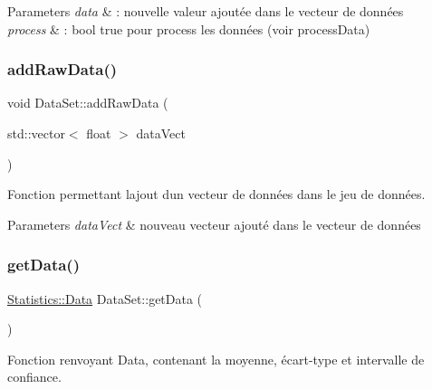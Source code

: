 \begin{DoxyParams}{Parameters}
{\em data} & \+: nouvelle valeur ajoutée dans le vecteur de données \\
\hline
{\em process} & \+: bool true pour process les données (voir process\+Data) \\
\hline
\end{DoxyParams}
\mbox{\label{classDataSet_a71cfe353100966c9bdfb1f6880075691}} 
\subsubsection{\texorpdfstring{add\+Raw\+Data()}{addRawData()}\hspace{0.1cm}{\footnotesize\ttfamily [2/2]}}
{\footnotesize\ttfamily void Data\+Set\+::add\+Raw\+Data (\begin{DoxyParamCaption}\item[{std\+::vector$<$ float $>$}]{data\+Vect }\end{DoxyParamCaption})}



Fonction permettant l\textquotesingle{}ajout d\textquotesingle{}un vecteur de données dans le jeu de données. 


\begin{DoxyParams}{Parameters}
{\em data\+Vect} & nouveau vecteur ajouté dans le vecteur de données \\
\hline
\end{DoxyParams}
\mbox{\label{classDataSet_af646e5b745734c1b18f2e90117e1d3c1}} 
\subsubsection{\texorpdfstring{get\+Data()}{getData()}}
{\footnotesize\ttfamily \hyperlink{structStatistics_1_1Data}{Statistics\+::\+Data} Data\+Set\+::get\+Data (\begin{DoxyParamCaption}{ }\end{DoxyParamCaption})}



Fonction renvoyant Data, contenant la moyenne, écart-\/type et intervalle de confiance. 

\mbox{\label{classDataSet_a05c7eba44d4d75941172628b1845f108}} 
